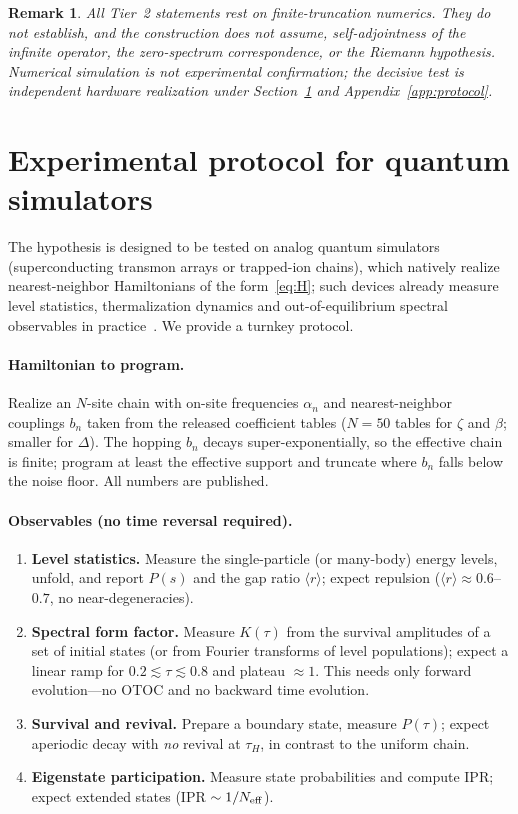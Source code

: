 \documentclass[aps,prx,reprint,floatfix]{revtex4-2}
\newtheorem*{remark*}{Remark}
\begin{document}
\begin{remark*}
All Tier~2 statements rest on finite-truncation numerics. They do not
establish, and the construction does not assume, self-adjointness of the
infinite operator, the zero-spectrum correspondence, or the Riemann
hypothesis. Numerical simulation is not experimental confirmation; the
decisive test is independent hardware realization under
Section~\ref{sec:protocol} and Appendix~\ref{app:protocol}.
\end{remark*}

\section{Experimental protocol for quantum simulators}
\label{sec:protocol}

The hypothesis is designed to be tested on analog quantum simulators
(superconducting transmon arrays or trapped-ion chains), which natively
realize nearest-neighbor Hamiltonians of the form~\eqref{eq:H}; such devices
already measure level statistics, thermalization dynamics and
out-of-equilibrium spectral observables in practice~\cite{neill2016,kaufman2016}.
We provide a turnkey protocol.

\paragraph{Hamiltonian to program.}
Realize an $N$-site chain with on-site frequencies $\alpha_n$ and
nearest-neighbor couplings $b_n$ taken from the released coefficient tables
($N=50$ tables for $\zeta$ and $\beta$; smaller for $\Delta$). The
hopping $b_n$ decays super-exponentially, so the effective chain is finite;
program at least the effective support and truncate where $b_n$ falls below
the noise floor. All numbers are published.

\paragraph{Observables (no time reversal required).}
\begin{enumerate}[leftmargin=1.4em]
\item \textbf{Level statistics.} Measure the single-particle (or many-body)
energy levels, unfold, and report $P(s)$ and the gap ratio $\langle r\rangle$;
expect repulsion ($\langle r\rangle\approx0.6$--$0.7$, no near-degeneracies).
\item \textbf{Spectral form factor.} Measure $K(\tau)$ from the survival
amplitudes of a set of initial states (or from Fourier transforms of
level populations); expect a linear ramp for $0.2\lesssim\tau\lesssim0.8$
and plateau $\approx1$. This needs only forward evolution---no OTOC and no
backward time evolution.
\item \textbf{Survival and revival.} Prepare a boundary state, measure
$P(\tau)$; expect aperiodic decay with \emph{no} revival at $\tau_H$, in
contrast to the uniform chain.
\item \textbf{Eigenstate participation.} Measure state probabilities and
compute IPR; expect extended states (IPR $\sim 1/N_{\rm eff}$).
\end{enumerate}
\end{document}
